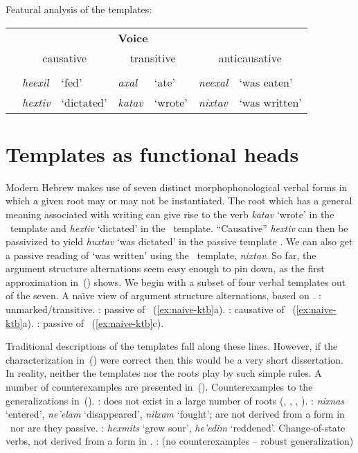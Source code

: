 \ex\label{ex:alternations-heb2}Featural analysis of the templates:\\
	\begin{tabular}{cll|ll|ll}
	& \multicolumn{2}{P{4cm}|}{\textbf{\vd}}	&	\multicolumn{2}{P{4cm}|}{\textbf{Voice}}	& \multicolumn{2}{P{4cm}}{\textbf{\vz}}\\
	\phantom{Semantics} & \multicolumn{2}{c|}{causative} &	\multicolumn{2}{c|}{transitive}	& \multicolumn{2}{c}{anticausative}\\\cline{2-7}
	& \multicolumn{2}{c|}{\thif}	&	\multicolumn{2}{c|}{\tkal}	& \multicolumn{2}{c}{\tnif}\\
	& \emph{heexil}	& `fed' &	\emph{axal}	& `ate'	&	\emph{neexal}	& `was eaten' \\
	& \emph{hextiv}	& `dictated' &	\emph{katav}	& `wrote'	&	\emph{nixtav}	& `was written' \\
	\end{tabular}
\xe




\section{Templates as functional heads}
Modern Hebrew makes use of seven distinct morphophonological verbal forms in which a given root may or may not be instantiated. The root  which has a general meaning associated with writing can give rise to the verb \emph{katav} `wrote' in the \tkal~template and \emph{hextiv} `dictated' in the \thif~template. ``Causative'' \emph{hextiv} can then be passivized to yield \emph{huxtav} `was dictated' in the passive template \thuf. We can also get a passive reading of `was written' using the \tnif~template, \emph{nixtav}. So far, the argument structure alternations seem easy enough to pin down, as the first approximation in~(\nextx) shows. We begin with a subset of four verbal templates out of the seven.
\pex\label{ex:naive-ktb} A na\"{\i}ve view of argument structure alternations, based on .
  \a \tkal: unmarked/transitive.
  \a \tnif: passive of \tkal~(\ref{ex:naive-ktb}a).
  \a \thif: causative of \tkal~(\ref{ex:naive-ktb}a).
  \a \thuf: passive of \thif~(\ref{ex:naive-ktb}c).
\xe

Traditional descriptions of the templates fall along these lines. However, if the characterization in~(\lastx) were correct then this would be a very short dissertation. In reality, neither the templates nor the roots play by such simple rules. A number of counterexamples are presented in~(\nextx).
\pex Counterexamples to the generalizations in~(\lastx).
  \a \tkal: does not exist in a large number of roots (, , , ).
  \a \tnif: \emph{nixnas} `entered', \emph{ne'elam} `disappeared', \emph{nilxam} `fought'; are not derived from a form in \tkal~nor are they passive.
  \a \thif: \emph{hexmits} `grew sour', \emph{he'edim} `reddened'. Change-of-state verbs, not derived from a form in \tkal.
  \a \thuf: (no counterexamples -- robust generalization)
\xe

